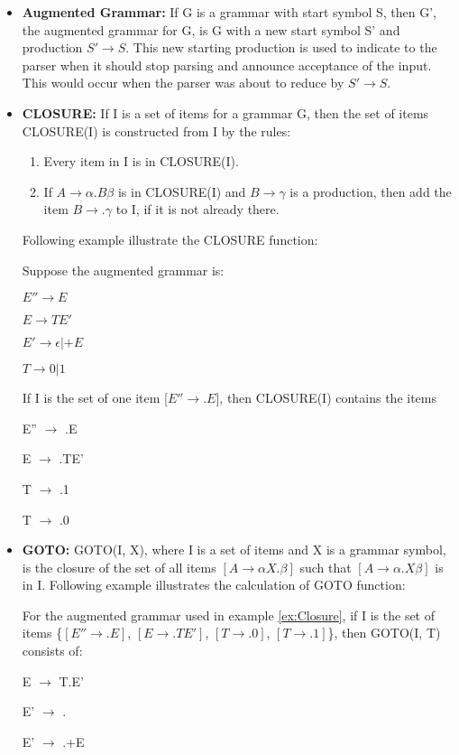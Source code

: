 \begin{itemize}
\item \textbf{Augmented Grammar:} If G is a grammar with start symbol S, then G', the augmented grammar for G, is G with a new start symbol S' and production $S'\rightarrow S$. This new starting production is used to indicate to the parser when it should stop parsing and announce acceptance of the input. This would occur when the parser was about to reduce by $S'\rightarrow S$.

\item \textbf{CLOSURE:} If I is a set of items for a grammar G, then the set of items CLOSURE(I) is constructed from I by the rules:
\begin{enumerate}
\item Every item in I is in CLOSURE(I).
\item If $A\rightarrow\alpha.B\beta$ is in CLOSURE(I) and $B\rightarrow\gamma$ is a production, then add the item $B\rightarrow.\gamma$ to I, if it is not already there.
\end{enumerate}

Following example illustrate the CLOSURE function:
\begin{example}
\label{ex:Closure}
Suppose the augmented grammar is:

$E''\rightarrow E$

$E\rightarrow TE'$

$E'\rightarrow \epsilon | +E$

$T\rightarrow 0 | 1$

If I is the set of one item {[$E''\rightarrow .E$]}, then CLOSURE(I) contains the items

E'' $\rightarrow$ .E

E $\rightarrow$ .TE'

T $\rightarrow$ .1

T $\rightarrow$ .0
\end{example}

\item \textbf{GOTO:} GOTO(I, X), where I is a set of items and X is a grammar symbol, is the closure of the set of all items $[A\rightarrow\alpha X.\beta]$ such that $[A\rightarrow\alpha.X\beta]$ is in I.
Following example illustrates the calculation of GOTO function:
\begin{example}
For the augmented grammar used in example \ref{ex:Closure}, if I is the set of items \{$[E''\rightarrow.E]$, $[E\rightarrow .TE']$, $[T\rightarrow.0]$, $[T\rightarrow.1]$\}, then GOTO(I, T) consists of:

E $\to$ T.E'

E' $\to$ .
    
E' $\to$ .+E
\end{example}
\end{itemize}

